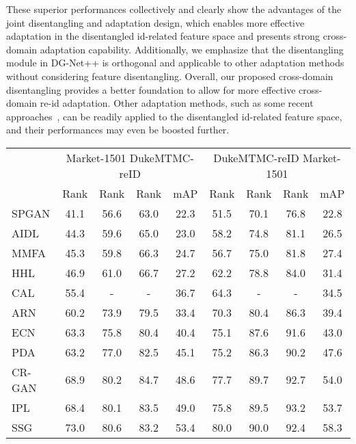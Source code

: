 \documentclass[runningheads]{llncs}
\begin{document}
These superior performances collectively and clearly show the advantages of the joint disentangling and adaptation design, which enables more effective adaptation in the disentangled id-related feature space and presents strong cross-domain adaptation capability. 
Additionally, we emphasize that the disentangling module in DG-Net++ is orthogonal and applicable to other adaptation methods without considering feature disentangling. Overall, our proposed cross-domain disentangling provides a better foundation to allow for more effective cross-domain re-id adaptation. Other adaptation methods, such as some recent approaches~\cite{Fu_2019_ICCV,Ge2020Mutual,zhong2019invariance}, can be readily applied to the disentangled id-related feature space, and their performances may even be boosted further.

\begin{table}[t]
\centering
\begin{tabular*}{\linewidth}{l|cccc|cccc}
\shline
\multirow{2}{*}{Methods} & \multicolumn{4}{c|}{Market-1501  DukeMTMC-reID} & \multicolumn{4}{c}{DukeMTMC-reID  Market-1501} \\
  & Rank & Rank & Rank & mAP & Rank & Rank & Rank & mAP\\ \hline
SPGAN \cite{deng2018image} & 41.1 & 56.6 & 63.0 & 22.3  & 51.5 & 70.1 & 76.8 & 22.8 \\
AIDL \cite{wang2018transferable} & 44.3 & 59.6 & 65.0 & 23.0 & 58.2 & 74.8 &  81.1 & 26.5 \\
MMFA \cite{linmulti} & 45.3 & 59.8 & 66.3 & 24.7  & 56.7 & 75.0 & 81.8 & 27.4 \\
HHL \cite{zhunzhong2018eccv} & 46.9 & 61.0 & 66.7 & 27.2 & 62.2 & 78.8 & 84.0 & 31.4 \\
CAL \cite{Qi_2019_ICCV} & 55.4 & - & - & 36.7 & 64.3 & - & - & 34.5\\
ARN \cite{li2018adaptation} & 60.2 & 73.9 & 79.5 & 33.4 & 70.3 & 80.4 & 86.3 & 39.4\\
ECN \cite{zhong2019invariance} & 63.3 & 75.8 & 80.4 & 40.4 & 75.1 & 87.6 & 91.6 & 43.0 \\
PDA \cite{li2019cross} & 63.2 & 77.0 & 82.5 & 45.1 & 75.2 & 86.3 & 90.2 & 47.6 \\
CR-GAN \cite{yanbei-chen} & 68.9 & 80.2 & 84.7 & 48.6 & 77.7 & 89.7 & 92.7 & 54.0 \\
IPL \cite{song2018unsupervised} & 68.4 & 80.1 & 83.5 & 49.0 & 75.8 & 89.5 & 93.2 & 53.7 \\
SSG \cite{Fu_2019_ICCV} & 73.0 & 80.6 & 83.2 & 53.4 & 80.0 & 90.0 & 92.4 & 58.3

\end{tabular*}
\end{table}
\end{document}
